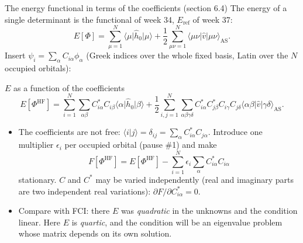 \documentclass[aspectratio=169,10pt]{beamer}
\newcommand{\braket}[2]{\langle #1\vert #2\rangle}
\newcommand{\element}[3]{\langle #1\vert #2\vert #3\rangle}
\begin{document}
\begin{frame}{The energy functional in terms of the coefficients (section 6.4)}
  \footnotesize
  The energy of a single determinant is the functional of week 34, $E_{\mathrm{ref}}$ of week 37:
  \[
    E[\Phi]=\sum_{\mu=1}^{N}\element{\mu}{\hat{h}_0}{\mu}+\frac12\sum_{\mu\nu=1}^{N}\element{\mu\nu}{\hat{v}}{\mu\nu}_{\mathrm{AS}} .
  \]
  Insert $\psi_i=\sum_\alpha C_{i\alpha}\phi_\alpha$ (Greek indices over the whole fixed basis, Latin over the $N$ occupied orbitals):
  \begin{block}{$E$ as a function of the coefficients}
    \[
      E[\Phi^{\mathrm{HF}}]=\sum_{i=1}^{N}\sum_{\alpha\beta}C_{i\alpha}^{*}C_{i\beta}\element{\alpha}{\hat{h}_0}{\beta}
      +\frac12\sum_{i,j=1}^{N}\sum_{\alpha\beta\gamma\delta}C_{i\alpha}^{*}C_{j\beta}^{*}C_{i\gamma}C_{j\delta}\element{\alpha\beta}{\hat{v}}{\gamma\delta}_{\mathrm{AS}} .
    \]
  \end{block}
  \begin{itemize}
    \item The coefficients are not free: $\braket{i}{j}=\delta_{ij}=\sum_\alpha C_{i\alpha}^{*}C_{j\alpha}$. Introduce one multiplier $\epsilon_i$ per occupied orbital (pause \#1) and make
    \[
      F[\Phi^{\mathrm{HF}}]=E[\Phi^{\mathrm{HF}}]-\sum_{i=1}^{N}\epsilon_i\sum_\alpha C_{i\alpha}^{*}C_{i\alpha}
    \]
    stationary. $C$ and $C^{*}$ may be varied independently (real and imaginary parts are two independent real variations): $\partial F/\partial C_{i\alpha}^{*}=0$.
    \item Compare with FCI: there $E$ was \emph{quadratic} in the unknowns and the condition linear. Here $E$ is \emph{quartic}, and the condition will be an eigenvalue problem whose matrix depends on its own solution.
  \end{itemize}
\end{frame}
\end{document}
